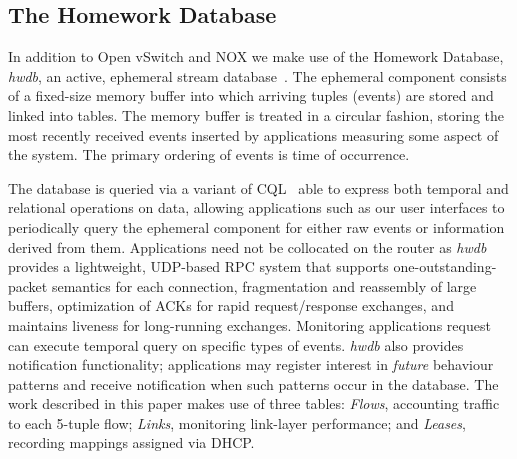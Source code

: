 
\subsection{The Homework Database} \label{s:hwdb}
 
 
In addition to Open vSwitch and NOX we make use of the Homework Database,
\emph{hwdb}, an active, ephemeral stream
database~\cite{sventek11:_infor_plane_archit_suppor_home_networ_manag}.  The
ephemeral component consists of a fixed-size memory buffer into which arriving
tuples (events) are stored and linked into tables.  The memory buffer is treated
in a circular fashion, storing the most recently received events inserted by
applications measuring some aspect of the system.  The primary ordering of
events is time of occurrence.  

The database is queried via a variant of CQL~\cite{arasu05:_cql} able to express
both temporal and relational operations on data, allowing applications such as
our user interfaces to periodically query the ephemeral component for either raw
events or information derived from them. 
Applications need not be collocated on the router as \emph{hwdb} provides a
lightweight, UDP-based RPC system that supports one-outstanding-packet semantics
for each connection, fragmentation and reassembly of large buffers, optimization
of ACKs for rapid request/response exchanges, and maintains liveness for
long-running exchanges.  Monitoring applications request can execute temporal
query on specific types of events.  \emph{hwdb} also provides notification
functionality; applications may register interest in \emph{future} behaviour
patterns and receive notification when such patterns occur in the
database.  The work described in this paper makes use of three tables:
\emph{Flows}, accounting traffic to each 5-tuple flow; \emph{Links}, monitoring
link-layer performance; and \emph{Leases}, recording mappings assigned via DHCP.


